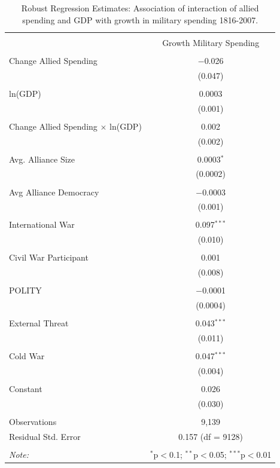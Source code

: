 \documentclass[12pt]{article}
\begin{document}
\begin{table}[!htbp] \centering 
\begin{tabular}{@{\extracolsep{5pt}}lc} 
\\[-1.8ex]\hline 
\hline \\[-1.8ex] 
  & Growth Military Spending \\ 
\hline \\[-1.8ex] 
 Change Allied Spending & $-$0.026 \\ 
  & (0.047) \\ 
  & \\ 
 ln(GDP) & 0.0003 \\ 
  & (0.001) \\ 
  & \\ 
 Change Allied Spending $\times$ ln(GDP) & 0.002 \\ 
  & (0.002) \\ 
  & \\ 
 Avg. Alliance Size & 0.0003$^{*}$ \\ 
  & (0.0002) \\ 
  & \\ 
 Avg Alliance Democracy & $-$0.0003 \\ 
  & (0.001) \\ 
  & \\ 
 International War & 0.097$^{***}$ \\ 
  & (0.010) \\ 
  & \\ 
 Civil War Participant & 0.001 \\ 
  & (0.008) \\ 
  & \\ 
 POLITY & $-$0.0001 \\ 
  & (0.0004) \\ 
  & \\ 
 External Threat & 0.043$^{***}$ \\ 
  & (0.011) \\ 
  & \\ 
 Cold War & 0.047$^{***}$ \\ 
  & (0.004) \\ 
  & \\ 
 Constant & 0.026 \\ 
  & (0.030) \\ 
\hline \\[-1.8ex] 
Observations & 9,139 \\ 
Residual Std. Error & 0.157 (df = 9128) \\ 
\hline 
\hline \\[-1.8ex] 
\textit{Note:}  & \multicolumn{1}{r}{$^{*}$p$<$0.1; $^{**}$p$<$0.05; $^{***}$p$<$0.01} \\ 
\end{tabular} 
\caption{Robust Regression Estimates: Association of interaction of allied spending and GDP with growth in military spending 1816-2007.}
\label{tab:rreg-res}
\end{table}
\end{document}
